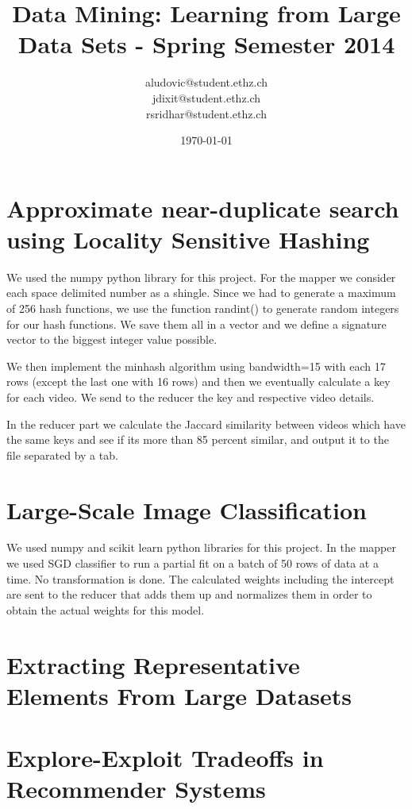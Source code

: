 \documentclass[a4paper, 11pt]{article}
\title{Data Mining: Learning from Large Data Sets - Spring Semester 2014}
\author{aludovic@student.ethz.ch\\ jdixit@student.ethz.ch\\ rsridhar@student.ethz.ch\\}
\date{\today}
\begin{document}
\maketitle

\section{Approximate near-duplicate search using Locality Sensitive Hashing} 

We used the numpy python library for this project. For the mapper we consider each space delimited number as a shingle. Since we had to generate a maximum of 256 hash functions, we use the function randint() to generate random integers for our hash functions. We save them all in a vector and we define a signature vector to the biggest integer value possible.

We then implement the minhash algorithm using bandwidth=15 with each 17 rows (except the last one with 16 rows) and then we eventually calculate a key for each video. We send to the reducer the key and respective video details.

In the reducer part we calculate the Jaccard similarity between videos which have the same keys and see if its more than 85 percent similar, and output it to the file separated by a tab.



\section{Large-Scale Image Classification}

We used numpy and scikit learn python libraries for this project. In the mapper we used SGD classifier to run a partial fit on a batch of 50 rows of data at a time. No transformation is done. The calculated weights including the intercept are sent to the reducer that adds them up and normalizes them in order to obtain the actual weights for this model.

\section{Extracting Representative Elements From Large Datasets}


\section{Explore-Exploit Tradeoffs in Recommender Systems}
\end{document}
